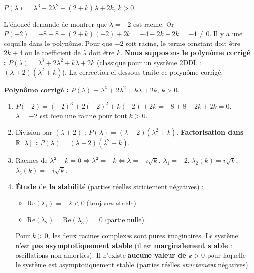 \documentclass[11pt]{article}
\begin{document}
\begin{corrige}
$P(\lambda) = \lambda^3 + 2\lambda^2 + (2+k)\lambda + 2k$, $k > 0$.
\begin{attention}
L'énoncé demande de montrer que $\lambda = -2$ est racine. Or $P(-2) = -8 + 8 + (2+k)(-2) + 2k = -4 -2k + 2k = -4 \neq 0$.
Il y a une coquille dans le polynôme. Pour que $-2$ soit racine, le terme constant doit être $2k+4$ ou le coefficient de $\lambda$ doit être $k$.
\textbf{Nous supposons le polynôme corrigé :} $P(\lambda) = \lambda^3 + 2\lambda^2 + k\lambda + 2k$ (classique pour un système 2DDL : $(\lambda+2)(\lambda^2+k)$).
La correction ci-dessous traite ce polynôme corrigé.
\end{attention}

\textbf{Polynôme corrigé :} $P(\lambda) = \lambda^3 + 2\lambda^2 + k\lambda + 2k$, $k > 0$.
\begin{enumerate}
\item $P(-2) = (-2)^3 + 2(-2)^2 + k(-2) + 2k = -8 + 8 - 2k + 2k = 0$.
$\lambda = -2$ est bien une racine pour tout $k > 0$.

\item Division par $(\lambda+2)$ : $P(\lambda) = (\lambda+2)(\lambda^2 + k)$.
\textbf{Factorisation dans $\mathbb{R}[\lambda]$ :} $\boxed{P(\lambda) = (\lambda+2)(\lambda^2 + k)}$.

\item Racines de $\lambda^2 + k = 0 \iff \lambda^2 = -k \iff \lambda = \pm i\sqrt{k}$.
$\boxed{\lambda_1 = -2}$, $\boxed{\lambda_2(k) = i\sqrt{k}}$, $\boxed{\lambda_3(k) = -i\sqrt{k}}$.

\item \textbf{Étude de la stabilité} (parties réelles strictement négatives) :
\begin{itemize}
\item $\text{Re}(\lambda_1) = -2 < 0$ (toujours stable).
\item $\text{Re}(\lambda_2) = \text{Re}(\lambda_3) = 0$ (partie nulle).
\end{itemize}
Pour $k > 0$, les deux racines complexes sont pures imaginaires. Le système n'est \textbf{pas asymptotiquement stable} (il est \textbf{marginalement stable} : oscillations non amorties).
Il n'existe \textbf{aucune valeur de $k > 0$} pour laquelle le système est asymptotiquement stable (parties réelles \emph{strictement} négatives).


\end{enumerate}
\end{corrige}
\end{document}
